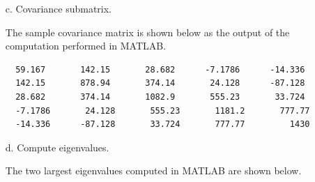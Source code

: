 \documentclass[12pt]{report}
\begin{document}
\begin{enumerate}
  \begin{figure}[H]
    \centering {}
  \end{figure}

  \newpage
\item[c.] Covariance submatrix.

  The sample covariance matrix is shown below as the output of the computation
  performed in MATLAB.

\begin{verbatim}
  59.167       142.15       28.682      -7.1786      -14.336
  142.15       878.94       374.14       24.128      -87.128
  28.682       374.14       1082.9       555.23       33.724
  -7.1786       24.128       555.23       1181.2       777.77
  -14.336      -87.128       33.724       777.77         1430
\end{verbatim}

\item[d.] Compute eigenvalues.

  The two largest eigenvalues computed in MATLAB are shown below.


\end{enumerate}
\end{document}
